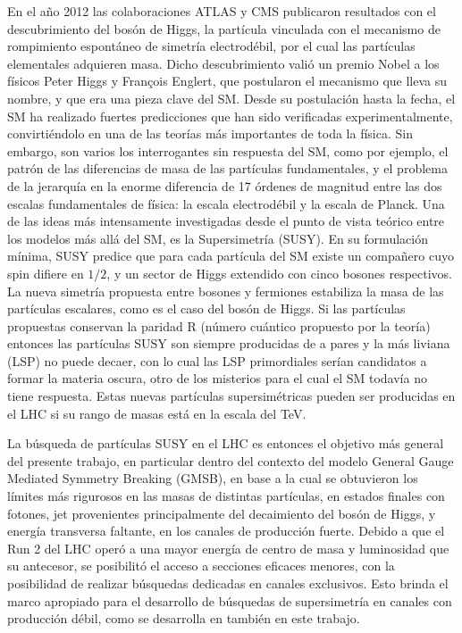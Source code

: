 En el año 2012 las colaboraciones ATLAS y CMS publicaron resultados con el descubrimiento del bosón de Higgs, la partícula vinculada con el mecanismo de rompimiento espontáneo de simetría electrodébil, por el cual las partículas elementales adquieren masa. Dicho descubrimiento valió un premio Nobel a los físicos Peter Higgs y François Englert, que postularon el mecanismo que lleva su nombre, y que era una pieza clave del SM. Desde su postulación hasta la fecha, el SM ha realizado fuertes predicciones que han sido verificadas experimentalmente, convirtiéndolo en una de las teorías más importantes de toda la física. Sin embargo, son varios los interrogantes sin respuesta del 
SM, como por ejemplo, el patrón de las diferencias de masa de las partículas fundamentales, y el problema de la jerarquía en la enorme diferencia de 17 órdenes de magnitud entre las dos escalas fundamentales de física: la escala electrodébil y la escala de Planck. Una de las ideas más intensamente investigadas desde el punto de vista teórico entre los modelos más allá del SM, es la Supersimetría (SUSY). En su formulación mínima, SUSY predice que para cada partícula del SM existe un compañero cuyo spin difiere en $1/2$, y un sector de Higgs extendido con cinco bosones respectivos. La nueva simetría propuesta entre bosones y fermiones estabiliza la masa de las partículas escalares, como es el caso del bosón de Higgs. Si las partículas propuestas conservan la paridad R (número cuántico propuesto por la teoría) entonces las partículas SUSY son siempre producidas de a pares y la más liviana (LSP) no puede decaer, con lo cual las LSP primordiales serían candidatos a formar la materia oscura, otro de los misterios para el cual el SM todavía no tiene respuesta. Estas nuevas partículas supersimétricas pueden ser producidas en el LHC si su rango de masas está en la escala del TeV. 

La búsqueda de partículas SUSY en el LHC es entonces el objetivo más general del presente trabajo, en particular dentro del contexto del modelo General Gauge Mediated Symmetry Breaking (GMSB), en base a la cual se obtuvieron los límites más rigurosos en las masas de distintas partículas, en estados finales con fotones, jet provenientes principalmente del decaimiento del bosón de Higgs, y energía transversa faltante, en los canales de producción fuerte. Debido a que el Run 2 del LHC operó a una mayor energía de centro de masa y luminosidad que su antecesor, se posibilitó el acceso a secciones eficaces menores, con la posibilidad de realizar búsquedas dedicadas en canales exclusivos. Esto brinda el marco apropiado para el desarrollo de búsquedas de supersimetría en canales con producción débil, como se desarrolla en también en este trabajo. 

